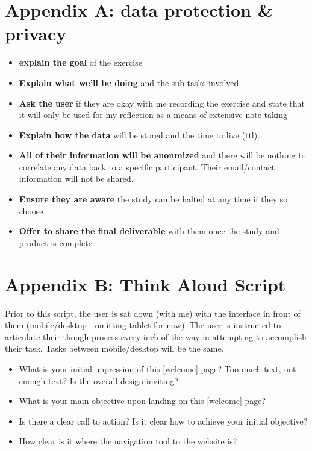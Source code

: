 \section{Appendix A: data protection & privacy}

\begin{itemize}
\item
  \textbf{explain the goal} of the exercise
\item
  \textbf{Explain what we'll be doing} and the sub-tasks involved
\item
  \textbf{Ask the user} if they are okay with me recording the exercise and state that it will only be used for my reflection as a means of extensive note taking
\item
  \textbf{Explain how the data} will be stored and the time to live (ttl).
\item
  \textbf{All of their information will be anonmized} and there will be nothing to correlate any data back to a specific participant. Their email/contact information will not be shared.
\item
  \textbf{Ensure they are aware} the study can be halted at any time if they so choose
\item
  \textbf{Offer to share the final deliverable} with them once the study and product is complete
\end{itemize}


\section{Appendix B: Think Aloud Script}
Prior to this script, the user is sat down (with me) with the interface in front of them (mobile/desktop - omitting tablet for now). The user is instructed to articulate their though process every inch of the way in attempting to accomplish their task. Tasks between mobile/desktop will be the same.

\begin{itemize}
\item
  What is your initial impression of this [welcome] page? Too much text, not enough text? Is the overall design inviting?
\item
  What is your main objective upon landing on this [welcome] page?
\item
  Is there a clear call to action? Is it clear how to achieve your initial objective?
\item
  How clear is it where the navigation tool to the website is?
\end{itemize}


